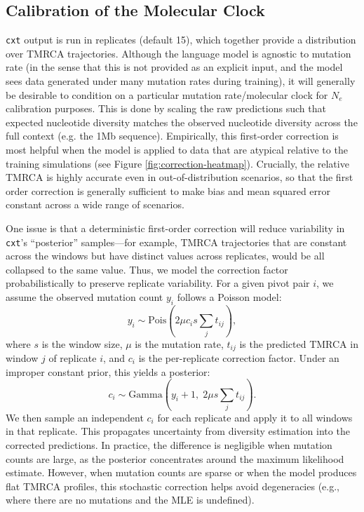 \documentclass[9pt,twoside]{pnas-new}
\newcommand{\cxtkit}{\texttt{cxt}\xspace}
\begin{document}
\subsection*{Calibration of the Molecular Clock}
\label{app:clock}

\cxtkit output is run in replicates (default 15), which together provide a distribution over TMRCA trajectories. 
Although the language model is agnostic to mutation rate (in the sense that this is not provided as an explicit input, and
the model sees data generated under many mutation rates during training), it will generally be desirable to condition on a particular mutation rate/molecular clock for $N_{e}$ calibration purposes. 
This is done by scaling the raw predictions such that expected nucleotide diversity matches the observed nucleotide diversity
across the full context (e.g. the 1Mb sequence).
Empirically, this first-order correction is most helpful when the model is applied to data that are atypical relative to the 
training simulations (see Figure \ref{fig:correction-heatmap}).
Crucially, the relative TMRCA is highly accurate even in out-of-distribution scenarios, so that the first order correction
is generally sufficient to make bias and mean squared error constant across a wide range of scenarios.

One issue is that a deterministic first-order correction will reduce variability in \cxtkit's ``posterior'' samples---for example, TMRCA trajectories that are constant across the windows but have distinct values across replicates, would be all collapsed to the same value. 
Thus, we model the correction factor probabilistically to preserve replicate variability. 
For a given pivot pair $i$, we assume the observed mutation count $y_i$ follows a Poisson model:
\[
y_i \sim \text{Pois}\left(2 \mu c_i s \sum_j t_{ij}\right),
\]
where $s$ is the window size, $\mu$ is the mutation rate, $t_{ij}$ is the predicted TMRCA in window $j$ of replicate $i$, 
and $c_i$ is the per-replicate correction factor. Under an improper constant prior, this yields a posterior:
\[
c_i \sim \text{Gamma}\left(y_i + 1,\; 2 \mu s \sum_j t_{ij}\right).
\]
We then sample an independent $c_i$ for each replicate and apply it to all windows in that replicate. 
This propagates uncertainty from diversity estimation into the corrected predictions. 
In practice, the difference is negligible when mutation counts are large, as the posterior concentrates around the maximum likelihood estimate. 
However, when mutation counts are sparse or when the model produces flat TMRCA profiles, 
this stochastic correction helps avoid degeneracies (e.g., where there are no mutations and the MLE is undefined). 
\end{document}
